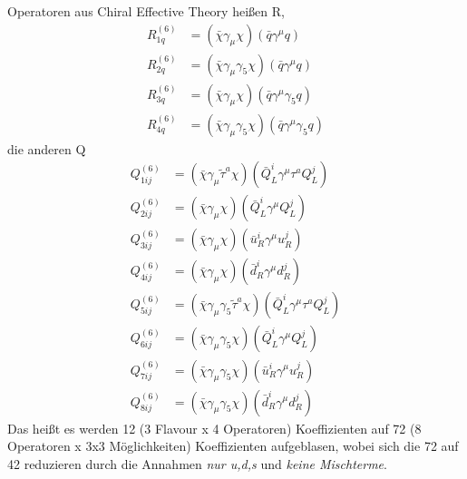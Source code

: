 Operatoren aus Chiral Effective Theory heißen R,
\begin{align*}
	R_{1q}^{(6)} &= (\bar{\chi}\gamma_\mu\chi)(\bar{q}\gamma^\mu q) \\
	R_{2q}^{(6)} &= (\bar{\chi}\gamma_\mu\gamma_5\chi)(\bar{q}\gamma^\mu q) \\
	R_{3q}^{(6)} &= (\bar{\chi}\gamma_\mu\chi)(\bar{q}\gamma^\mu\gamma_5q) \\
	R_{4q}^{(6)} &= (\bar{\chi}\gamma_\mu\gamma_5\chi)(\bar{q}\gamma^\mu\gamma_5q)
\end{align*}
die anderen Q
\begin{align*}
	Q_{1ij}^{(6)} &= (\bar{\chi}\gamma_\mu\tilde{\tau}^a\chi)(\bar{Q}_L^i\gamma^\mu \tau^aQ_L^j) \\
	Q_{2ij}^{(6)} &= (\bar{\chi}\gamma_\mu\chi)(\bar{Q}_L^i\gamma^\mu Q_L^j) \\
	Q_{3ij}^{(6)} &= (\bar{\chi}\gamma_\mu\chi)(\bar{u}_R^i\gamma^\mu u_R^j) \\
	Q_{4ij}^{(6)} &= (\bar{\chi}\gamma_\mu\chi)(\bar{d}_R^i\gamma^\mu d_R^j) \\
	Q_{5ij}^{(6)} &= (\bar{\chi}\gamma_\mu\gamma_5\tilde{\tau}^a\chi)(\bar{Q}_L^i\gamma^\mu \tau^aQ_L^j) \\
	Q_{6ij}^{(6)} &= (\bar{\chi}\gamma_\mu\gamma_5\chi)(\bar{Q}_L^i\gamma^\mu Q_L^j) \\
	Q_{7ij}^{(6)} &= (\bar{\chi}\gamma_\mu\gamma_5\chi)(\bar{u}_R^i\gamma^\mu u_R^j) \\
	Q_{8ij}^{(6)} &= (\bar{\chi}\gamma_\mu\gamma_5\chi)(\bar{d}_R^i\gamma^\mu d_R^j)
\end{align*}
Das heißt es werden 12 (3 Flavour x 4 Operatoren) Koeffizienten auf 72 (8 Operatoren x 3x3 Möglichkeiten) Koeffizienten aufgeblasen, wobei sich die 72 auf 42 reduzieren durch die Annahmen \textit{nur u,d,s} und \textit{keine Mischterme}.